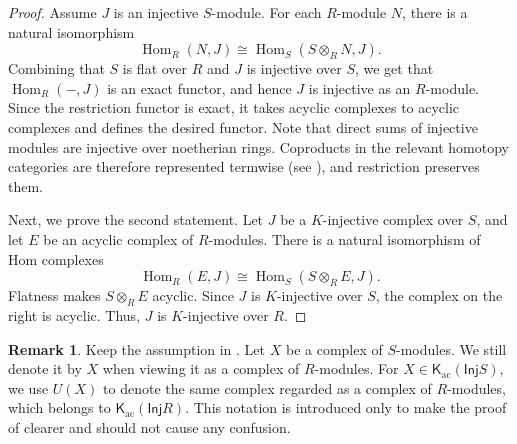 \documentclass{amsart}
\newcommand{\K}{\mathsf{K}}
\newcommand{\0}{{\bf{0}}}
\DeclareMathOperator{\ac}{ac}
\DeclareMathOperator{\Hom}{Hom}
\newcommand{\Inj}{\mathsf{Inj}}
\theoremstyle{definition}
\newtheorem{remark}[theorem]{Remark}
\begin{document}
\begin{proof}
Assume \(J\) is an injective \(S\)-module. For each \(R\)-module \(N\), there is a natural isomorphism
\[
\operatorname{Hom}_R(N,J)
\cong
\operatorname{Hom}_S(S\otimes_RN,J).
\]
Combining that $S$ is flat over $R$ and $J$ is injective over $S$, we get that $\Hom_R(-,J)$ is an exact functor, and hence \(J\) is injective as an \(R\)-module.
Since the restriction functor is exact, it takes acyclic complexes to acyclic complexes and defines the desired functor. Note that direct sums of injective modules are injective over noetherian rings. Coproducts in the relevant homotopy categories are therefore represented termwise (see \cite[Lemma 1.1]{BN}), and restriction preserves them.

Next, we prove the second statement. Let \(J\) be a \(K\)-injective complex over \(S\), and let \(E\) be an acyclic complex of \(R\)-modules. There is a natural isomorphism of Hom complexes
\[
\operatorname{Hom}_R(E,J)
\cong
\operatorname{Hom}_S(S\otimes_RE,J).
\]
Flatness makes \(S\otimes_RE\) acyclic.  Since \(J\) is \(K\)-injective over $S$, the complex on the right is acyclic. Thus, \(J\) is \(K\)-injective over \(R\).
\end{proof}

\begin{remark}
 Keep the assumption in . Let $X$ be a complex of $S$-modules. We still denote it by $X$ when viewing it as a complex of $R$-modules. For $X\in \K_{\ac}(\Inj S)$, we use $U(X)$ to denote the same complex regarded as a complex of $R$-modules, which belongs to $\K_{\ac}(\Inj R)$. This notation is introduced only to make the proof of  clearer and should not cause any confusion.
\end{remark}
\end{document}
